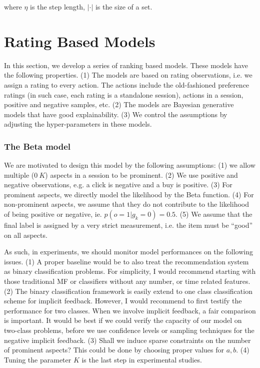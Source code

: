 \documentclass[11pt]{report}
\begin{document}
where $\eta$ is the step length, $|\cdot|$ is the size of a set.
 
\part{Rating Based Models}
In this section, we develop a series of ranking based models. These models have the following properties. (1) The models are based on rating observations, i.e. we assign a rating to every action. The actions include the old-fashioned preference ratings (in such case, each rating is a standalone session), actions in a session, positive and negative samples, etc. (2) The models are Bayesian generative models that have good explainability. (3) We control the assumptions by adjusting the hyper-parameters in these models.
   
\section{The Beta model}
 We are motivated to design this model by the following assumptions: (1) we allow  multiple ($0~K$) aspects in a session to be prominent. (2) We use positive and negative observations, e.g. a click is negative and a buy is positive. (3) For prominent aspects, we directly model the likelihood by the Beta function. (4) For non-prominent aspects, we assume that they do not contribute to the likelihood of being positive or negative, ie. $p(o=1|g_k=0)=0.5$.  (5) We assume that the final label is assigned by a very strict measurement, i.e. the item must be ``good'' on all aspects.
 
As such, in experiments, we should monitor model performances on the following issues. (1) A proper baseline would be to also treat the recommendation system as binary classification problems. For simplicity, I would recommend starting with those traditional MF or classifiers without any number, or time related features. (2) The binary classification framework is easily extend to one class classification scheme for implicit feedback. However, I would recommend to first testify the performance for two classes. When we involve implicit feedback, a fair comparison is important. It would be best if we could verify the capacity of our model on two-class problems, before we use confidence levels or sampling techniques for the negative implicit feedback. (3) Shall we induce sparse constraints on the number of prominent aspects? This could be done by choosing proper values for $a,b$.  (4) Tuning the parameter $K$ is the last step in experimental studies.
 
\end{document}
